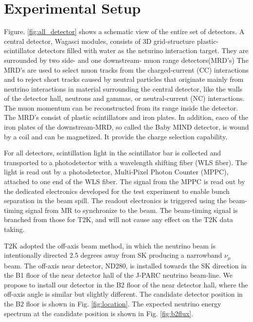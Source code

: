 \section{Experimental Setup}
Figure. \ref{fig:all_detector} shows a schematic view of the entire set of detectors.
A central detector, Wagasci modules, consists of 3D grid-structure plastic-scintillator detectors filled with water as the neturino interaction target.
They are surrounded by two side- and one downstream- muon range detectors(MRD's)
The MRD's are used to select muon tracks from the charged-current (CC) interactions 
and to reject short tracks caused by neutral particles 
that originate mainly from neutrino interactions in material surrounding the central detector, like the walls of the detector hall,
neutrons and gammas, or neutral-current (NC) interactions.
The muon momentum can be reconstructed from its range inside the detector.
The MRD's consist of plastic scintillators and iron plates.
In addition, eaco of the iron plates of the downstream-MRD, so called the Baby MIND detector, is wound by a coil and
can be magnetized. It provide the charge selection capability.

For all detectors, scintillation light in the scintillator bar is collected and transported to a photodetector with a wavelength shifting fiber (WLS fiber).
The light is read out by a photodetector, Multi-Pixel Photon Counter (MPPC), attached to one end of the WLS fiber.
The signal from the MPPC is read out by the dedicated electronics developed for the test experiment
to enable bunch separation in the beam spill.
The readout electronics is triggered using the beam-timing signal from MR to synchronize to the beam.
The beam-timing signal is branched from those for T2K, and will not cause any effect on the T2K data taking.


T2K adopted the off-axis beam method, in which
the neutrino beam is intentionally directed 2.5 degrees away from SK producing a narrowband $\nu_{\mu}$ beam.
The off-axis near detector, ND280, is installed towards the SK direction in the B1 floor of the near detector hall of the J-PARC neutrino beam-line.
We propose to install our detector in the B2 floor of the near detector hall, 
where the off-axis angle is similar but slightly different.
The candidate detector position in the B2 floor is shown in Fig. \ref{fig:location}.
The expected neutrino energy spectrum at the candidate position is shown in Fig. \ref{fig:b2flux}.

